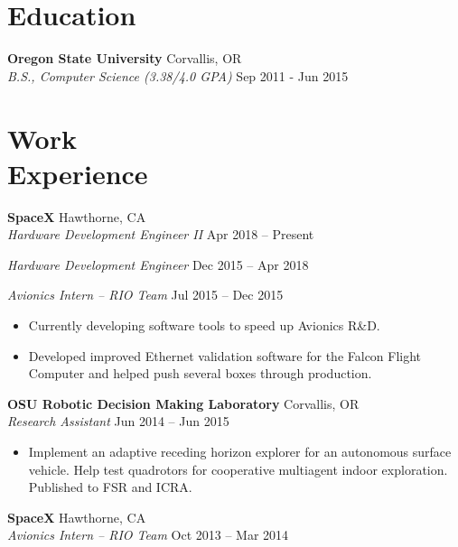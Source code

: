 \documentclass[10pt,letterpaper,margin]{res}
\newcommand{\org}[2]{{\bf #1} \hfill {\color{lightgray} #2} \\}
\newcommand{\pos}[2]{{\it #1} \hfill {\color{lightgray} #2} \vspace{0.0em}}
\begin{document}
\begin{resume}

\section{Education}

\org {Oregon State University} {Corvallis, OR}
\pos {B.S., Computer Science (3.38/4.0 GPA)} {Sep 2011 - Jun 2015}


\section{Work \\ Experience}

\org {SpaceX} {Hawthorne, CA}
\pos {Hardware Development Engineer II} {Apr 2018 -- Present}

\pos {Hardware Development Engineer} {Dec 2015 -- Apr 2018}


\pos {Avionics Intern -- RIO Team} {Jul 2015 -- Dec 2015}

\begin{itemize}
    \item Currently developing software tools to speed up Avionics R\&D.
    \item Developed improved Ethernet validation software for the Falcon Flight
      Computer and helped push several boxes through production.
\end{itemize}


\org {OSU Robotic Decision Making Laboratory} {Corvallis, OR}
\pos {Research Assistant} {Jun 2014 -- Jun 2015}

\begin{itemize}
    \item Implement an adaptive receding horizon explorer for an autonomous
        surface vehicle. Help test quadrotors for cooperative multiagent indoor
        exploration. Published to FSR and ICRA.
\end{itemize}


\org {SpaceX} {Hawthorne, CA}
\pos {Avionics Intern -- RIO Team} {Oct 2013 -- Mar 2014}


\end{resume}
\end{document}
